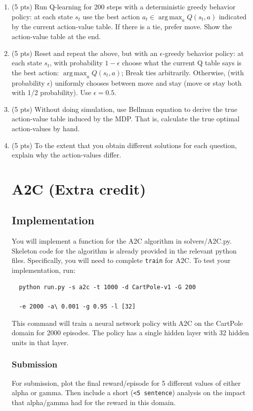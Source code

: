\documentclass[a4paper]{article}
\theoremstyle{definition}
\DeclareMathOperator*{\argmax}{arg\,max}
\begin{document}
\begin{enumerate}
	\item (5 pts) Run Q-learning for 200 steps with a deterministic greedy behavior policy: at each state $s_t$ use the best action $a_t \in \argmax_a Q(s_t,a)$ indicated by the current action-value table. If there is a tie, prefer move. Show the action-value table at the end.

	\item (5 pts) Reset and repeat the above, but with an $\epsilon$-greedy behavior policy: at each state $s_t$, with probability $1-\epsilon$ choose what the current Q table says is the best action: $\argmax_a Q(s_t,a)$; Break ties arbitrarily. Otherwise, (with probability $\epsilon$) uniformly chooses between move and stay (move or stay both with 1/2 probability). Use $\epsilon=0.5$.

	\item (5 pts) Without doing simulation, use Bellman equation to derive the true action-value table induced by the MDP. That is, calculate the true optimal action-values by hand.

	\item (5 pts) To the extent that you obtain different solutions for each question, explain why the action-values  differ.

	      \section{A2C (Extra credit)}
	      \subsection{Implementation}

	      You will implement a function for the A2C algorithm in solvers/A2C.py.
	      Skeleton code for the algorithm is already provided in the relevant python files.
	      Specifically, you will need to complete \verb|train| for A2C.
	      To test your implementation, run:
	      \begin{verbatim}
  python run.py -s a2c -t 1000 -d CartPole-v1 -G 200 
  
  -e 2000 -a\ 0.001 -g 0.95 -l [32]
\end{verbatim}
	      This command will train a neural network policy with A2C on the CartPole domain for 2000 episodes.
	      The policy has a single hidden layer with 32 hidden units in that layer.
	      \subsubsection*{Submission}

	      For submission, plot the final reward/episode for 5 different values of either alpha or gamma. Then include a short (\verb|<5 sentence|) analysis on the impact that alpha/gamma had for the reward in this domain.



\end{enumerate}
\end{document}
